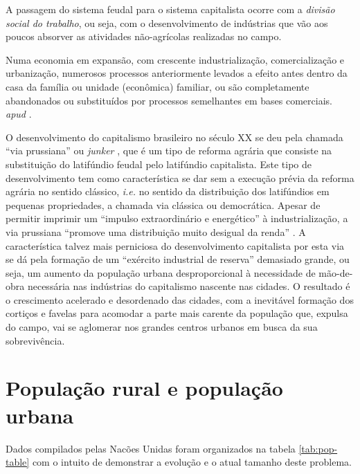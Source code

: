 \documentclass[
	12pt,				%
	oneside,			%
	a4paper,			%
	chapter=TITLE,		%
	section=TITLE,		%
	english,			%
	brazil				%
	]{abntex2}
\begin{document}
\begin{refsection}
A passagem do sistema feudal para o sistema capitalista ocorre com a \emph{divisão
social do trabalho}, ou seja, com o desenvolvimento de indústrias que vão aos
poucos absorver as atividades não-agrícolas realizadas no campo.
\begin{citacao}
Numa economia em expansão, com crescente industrialização, comercialização e
urbanização, numerosos processos anteriormente levados a efeito antes dentro da
casa da família ou unidade (econômica) familiar, ou são completamente
abandonados ou substituídos por processos semelhantes em bases
comerciais. \cite[p. 41]{kuznets} \textit{apud} \cite[p. 218]{rangel1956}.
\end{citacao}
O desenvolvimento do capitalismo brasileiro no século XX se deu pela chamada
``via prussiana'' ou \emph{junker} \autocite[155]{rangel1988}, que é um tipo de reforma agrária
que consiste na substituição do latifúndio feudal pelo latifúndio capitalista.
Este tipo de desenvolvimento tem como característica se dar sem a execução
prévia da reforma agrária no sentido clássico, \emph{i.e.} no sentido da distribuição
dos latifúndios em pequenas propriedades, a chamada via clássica ou democrática.
Apesar de permitir imprimir um ``impulso extraordinário e energético'' à
industrialização, a via prussiana ``promove uma distribuição muito desigual da
renda'' \autocite[155]{rangel1988}. A característica talvez mais perniciosa do
desenvolvimento capitalista por esta via se dá pela formação de um ``exército
industrial de reserva'' demasiado grande, ou seja, um aumento da população urbana
desproporcional à necessidade de mão-de-obra necessária nas indústrias do
capitalismo nascente nas cidades. O resultado é o crescimento acelerado e
desordenado das cidades, com a inevitável formação dos cortiços e favelas para
acomodar a parte mais carente da população que, expulsa do campo, vai se
aglomerar nos grandes centros urbanos em busca da sua sobrevivência.

\newpage

\hypertarget{populauxe7uxe3o-rural-e-populauxe7uxe3o-urbana}{%
\section{População rural e população urbana}\label{populauxe7uxe3o-rural-e-populauxe7uxe3o-urbana}}

Dados compilados pelas Nacões Unidas foram organizados na tabela
\ref{tab:pop-table} com o intuito de demonstrar a evolução e o atual tamanho
deste problema.
\begin{table}[H]


\end{table}
\end{refsection}
\end{document}

